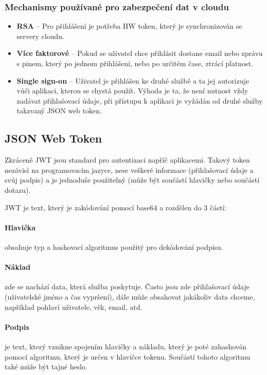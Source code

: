 \subsubsection{Mechanismy používané pro zabezpečení dat v cloudu}
\begin{itemize}
\item \textbf{RSA} -- Pro přihlášení je potřeba HW token, který je synchronizován se servery cloudu.
\item \textbf{Více faktorové} -- Pokud se uživatel chce přihlásit dostane email nebo zprávu s pinem, který po jednom přihlášení, nebo po určitém čase, ztrácí platnost.
\item \textbf{Single sign-on} -- Uživatel je přihlášen ke druhé službě a ta jej autorizuje vůči aplikaci, kterou se chystá použít. Výhoda je ta, že není nutnost vždy zadávat přihlašovací údaje, při přístupu k aplikaci je vyžádán od druhé služby takzvaný JSON web token. \cite{cloud-security}
\end{itemize}

\subsection{JSON Web Token}
\par Zkráceně JWT jsou standard pro autentizaci napříč aplikacemi. Takový token nezávisí na programovacím jazyce, nese veškeré informace (přihlašovací údaje a svůj podpis) a je jednoduše použitelný (může být součástí hlavičky nebo součástí dotazu). \cite{scotch-jwt}

\par JWT je text, který je zakódování pomocí base64 a rozdělen do 3 částí:

\paragraph{Hlavička} obsahuje typ a hashovací algoritmus použitý pro dekódování podpisu.

\paragraph{Náklad} zde se nachází data, která služba poskytuje. Často jsou zde přihlašovací údaje (uživatelské jméno a čas vypršení), dále může obsahovat jakákoliv data chceme, například pohlaví uživatele, věk, email, atd.

\paragraph{Podpis} je text, který vznikne spojením hlavičky a nákladu, který je poté zahashován pomocí algoritmu, který je určen v hlavičce tokenu. Součástí tohoto algoritmu také může být tajné heslo. \cite{rfc-jwt}

